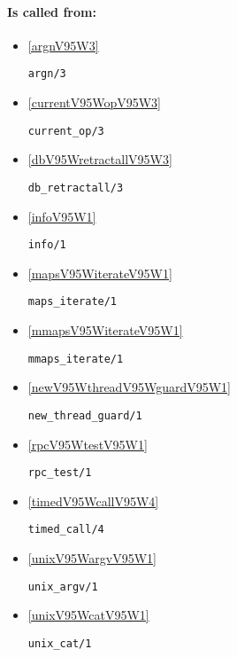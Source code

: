 \paragraph{Is called from:} 
\begin{itemize}
\item \ref{argnV95W3} 
\begin{verbatim}
argn/3
\end{verbatim}

\item \ref{currentV95WopV95W3} 
\begin{verbatim}
current_op/3
\end{verbatim}

\item \ref{dbV95WretractallV95W3} 
\begin{verbatim}
db_retractall/3
\end{verbatim}

\item \ref{infoV95W1} 
\begin{verbatim}
info/1
\end{verbatim}

\item \ref{mapsV95WiterateV95W1} 
\begin{verbatim}
maps_iterate/1
\end{verbatim}

\item \ref{mmapsV95WiterateV95W1} 
\begin{verbatim}
mmaps_iterate/1
\end{verbatim}

\item \ref{newV95WthreadV95WguardV95W1} 
\begin{verbatim}
new_thread_guard/1
\end{verbatim}

\item \ref{rpcV95WtestV95W1} 
\begin{verbatim}
rpc_test/1
\end{verbatim}

\item \ref{timedV95WcallV95W4} 
\begin{verbatim}
timed_call/4
\end{verbatim}

\item \ref{unixV95WargvV95W1} 
\begin{verbatim}
unix_argv/1
\end{verbatim}

\item \ref{unixV95WcatV95W1} 
\begin{verbatim}
unix_cat/1
\end{verbatim}

\end{itemize}

